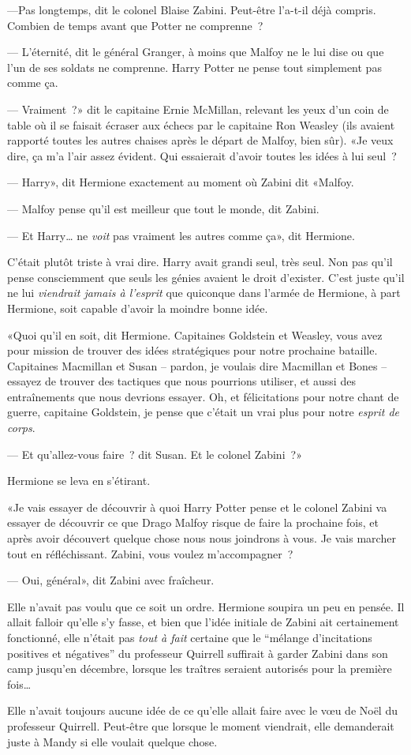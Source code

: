 ---Pas longtemps, dit le colonel Blaise Zabini. Peut-être l'a-t-il déjà compris. Combien de temps avant que Potter ne comprenne~?

--- L'éternité, dit le général Granger, à moins que Malfoy ne le lui dise ou que l'un de ses soldats ne comprenne. Harry Potter ne pense tout simplement pas comme ça.

--- Vraiment~?» dit le capitaine Ernie McMillan, relevant les yeux d'un coin de table où il se faisait écraser aux échecs par le capitaine Ron Weasley (ils avaient rapporté toutes les autres chaises après le départ de Malfoy, bien sûr). «Je veux dire, ça m'a l'air assez évident. Qui essaierait d'avoir toutes les idées à lui seul~?

--- Harry», dit Hermione exactement au moment où Zabini dit «Malfoy.

--- Malfoy pense qu'il est meilleur que tout le monde, dit Zabini.

--- Et Harry… ne \emph{voit} pas vraiment les autres comme ça», dit Hermione.

C'était plutôt triste à vrai dire. Harry avait grandi seul, très seul. Non pas qu'il pense consciemment que seuls les génies avaient le droit d'exister. C'est juste qu'il ne lui \emph{viendrait jamais à l'esprit} que quiconque dans l'armée de Hermione, à part Hermione, soit capable d'avoir la moindre bonne idée.

«Quoi qu'il en soit, dit Hermione. Capitaines Goldstein et Weasley, vous avez pour mission de trouver des idées stratégiques pour notre prochaine bataille. Capitaines Macmillan et Susan -- pardon, je voulais dire Macmillan et Bones -- essayez de trouver des tactiques que nous pourrions utiliser, et aussi des entraînements que nous devrions essayer. Oh, et félicitations pour notre chant de guerre, capitaine Goldstein, je pense que c'était un vrai plus pour notre \emph{esprit de corps}.

--- Et qu'allez-vous faire~? dit Susan. Et le colonel Zabini~?»

Hermione se leva en s'étirant.

«Je vais essayer de découvrir à quoi Harry Potter pense et le colonel Zabini va essayer de découvrir ce que Drago Malfoy risque de faire la prochaine fois, et après avoir découvert quelque chose nous nous joindrons à vous. Je vais marcher tout en réfléchissant. Zabini, vous voulez m'accompagner~?

--- Oui, général», dit Zabini avec fraîcheur.

Elle n'avait pas voulu que ce soit un ordre. Hermione soupira un peu en pensée. Il allait falloir qu'elle s'y fasse, et bien que l'idée initiale de Zabini ait certainement fonctionné, elle n'était pas \emph{tout à fait} certaine que le “mélange d'incitations positives et négatives” du professeur Quirrell suffirait à garder Zabini dans son camp jusqu'en décembre, lorsque les traîtres seraient autorisés pour la première fois…

Elle n'avait toujours aucune idée de ce qu'elle allait faire avec le vœu de Noël du professeur Quirrell. Peut-être que lorsque le moment viendrait, elle demanderait juste à Mandy si elle voulait quelque chose.~
